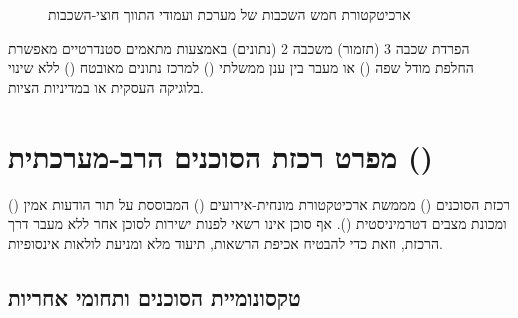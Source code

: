 \begin{figure}[htbp]
\begin{ltrblock}
{%
}
\end{ltrblock}
\caption{ארכיטקטורת חמש השכבות של מערכת  ועמודי התווך חוצי-השכבות}
\label{fig:five-layer}
\end{figure}

\begin{insightbox}
הפרדת שכבה 3 (תזמור) משכבה 2 (נתונים) באמצעות מתאמים סטנדרטיים מאפשרת החלפת מודל שפה () או מעבר בין ענן ממשלתי () למרכז נתונים מאובטח () ללא שינוי בלוגיקה העסקית או במדיניות הציות.
\end{insightbox}

\section{מפרט רכזת הסוכנים הרב-מערכתית ()}
\label{sec:agent-hub}

רכזת הסוכנים () מממשת ארכיטקטורת  מונחית-אירועים () המבוססת על תור הודעות אמין () ומכונת מצבים דטרמיניסטית (). אף סוכן אינו רשאי לפנות ישירות לסוכן אחר ללא מעבר דרך הרכזת, וזאת כדי להבטיח אכיפת הרשאות, תיעוד מלא ומניעת לולאות אינסופיות.

\subsection{טקסונומיית הסוכנים ותחומי אחריות}

